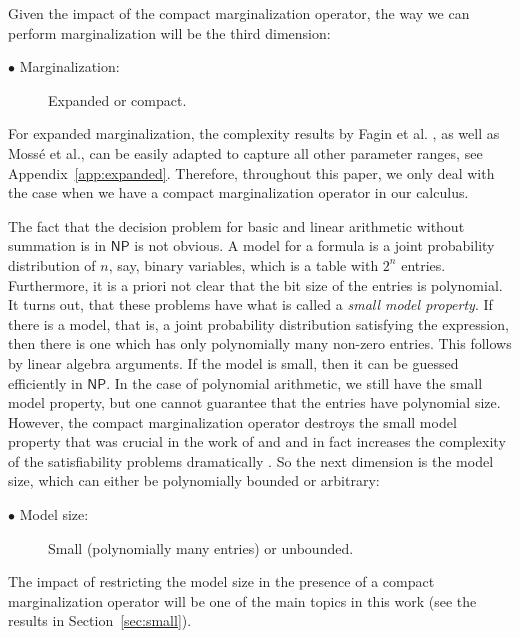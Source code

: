 \documentclass[a4paper,UKenglish,cleveref, autoref, thm-restate]{lipics-v2021}
\newcommand{\procOrFullVersion}[2]{#2}
\newcommand{\NP}{\ensuremath{\mathsf{NP}}}
\begin{document}
Given the impact of the compact marginalization operator, the way we can perform marginalization will be the third dimension: 

\begin{description}
    \item[$\bullet$ Marginalization:] Expanded or compact. 
\end{description}

For expanded marginalization, the complexity results by Fagin et al. \cite{fagin1990logic}, as well as Moss{\'e} \cite{ibeling2022mosse} et al., can be easily adapted to capture all other parameter ranges, see \procOrFullVersion{the full version of our work}{Appendix~\ref{app:expanded}}. Therefore, throughout this paper, we only deal with the case when we have a compact marginalization operator in our calculus.

The fact that the decision problem for basic and linear arithmetic without summation is in $\NP$ is not obvious. A model for a formula is a joint probability distribution of $n$, say, binary variables, which is a table with $2^n$ entries. Furthermore, it is a priori not clear that the bit size of the entries is polynomial. It turns out, that these problems have what is called a \emph{small model property}. If there is a model, that is, a joint probability distribution satisfying the expression, then there is one which has only polynomially many non-zero entries. This follows by linear algebra arguments. If the model is small, then it can be guessed efficiently in $\NP$. In the case of polynomial arithmetic, we still have the small model property, but one cannot guarantee that the entries have polynomial size.
However, the compact marginalization operator destroys the small model property that was crucial in the work of \cite{fagin1990logic} and \cite{ibeling2022mosse} and in fact increases the complexity of the satisfiability problems dramatically \citep{zander2023ijcai}. So the next dimension is the model size, which can either be polynomially bounded or arbitrary:

\begin{description}
    \item[$\bullet$  Model size:] Small (polynomially many entries) or unbounded. 
\end{description}

The impact of restricting the model size in the presence of a compact marginalization operator will be one of the main topics in this work (see the results in Section~\ref{sec:small}). 
\end{document}
